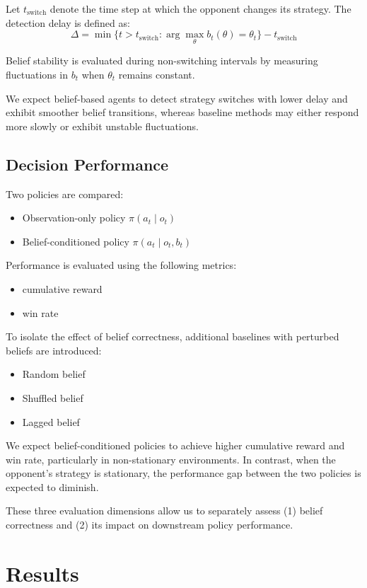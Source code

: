 \documentclass{article}
\begin{document}
Let $t_{\text{switch}}$ denote the time step at which the opponent changes its strategy. The detection delay is defined as:
\[
\Delta = \min \{ t > t_{\text{switch}} : \arg\max_{\theta} b_t(\theta) = \theta_t \} - t_{\text{switch}}
\]

Belief stability is evaluated during non-switching intervals by measuring fluctuations in $b_t$ when $\theta_t$ remains constant.

We expect belief-based agents to detect strategy switches with lower delay and exhibit smoother belief transitions, whereas baseline methods may either respond more slowly or exhibit unstable fluctuations.

\subsection{Decision Performance}

Two policies are compared:
\begin{itemize}
    \item Observation-only policy $\pi(a_t \mid o_t)$
    \item Belief-conditioned policy $\pi(a_t \mid o_t, b_t)$
\end{itemize}

Performance is evaluated using the following metrics:
\begin{itemize}
    \item cumulative reward
    \item win rate
\end{itemize}

To isolate the effect of belief correctness, additional baselines with perturbed beliefs are introduced:
\begin{itemize}
    \item Random belief
    \item Shuffled belief
    \item Lagged belief
\end{itemize}

We expect belief-conditioned policies to achieve higher cumulative reward and win rate, particularly in non-stationary environments. In contrast, when the opponent's strategy is stationary, the performance gap between the two policies is expected to diminish.

These three evaluation dimensions allow us to separately assess (1) belief correctness and (2) its impact on downstream policy performance.

\section{Results}
\end{document}
